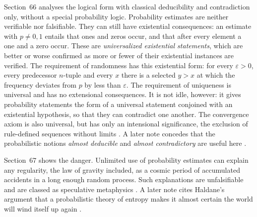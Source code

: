Section~66 analyses the logical form with classical deducibility and
contradiction only, without a special probability logic. Probability
estimates are neither verifiable nor falsifiable. They can still have
existential consequences: an estimate with \(p\neq0,1\) entails that
ones and zeros occur, and that after every element a one and a zero
occur. These are \emph{universalized existential statements}, which are
better or worse confirmed as more or fewer of their existential
instances are verified. The requirement of randomness has this
existential form: for every \(\varepsilon>0\), every predecessor
\(n\)-tuple and every \(x\) there is a selected \(y>x\) at which the
frequency deviates from \(p\) by less than \(\varepsilon\). The
requirement of uniqueness is universal and has no extensional
consequences. It is not idle, however: it gives probability statements
the form of a universal statement conjoined with an existential
hypothesis, so that they can contradict one another. The convergence
axiom is also universal, but has only an intensional significance, the
exclusion of rule-defined sequences without limits
\parencite[\S66 and notes~2--4]{Popper2002LogicDiscoveryUI}. A later
note concedes that the probabilistic notions \emph{almost deducible} and
\emph{almost contradictory} are useful here
\parencite[\S66, note~*1]{Popper2002LogicDiscoveryUI}.

Section~67 shows the danger. Unlimited use of probability estimates can
explain any regularity, the law of gravity included, as a cosmic period
of accumulated accidents in a long enough random process. Such
explanations are unfalsifiable and are classed as speculative
metaphysics \parencite[\S67]{Popper2002LogicDiscoveryUI}. A later note
cites Haldane's argument that a probabilistic theory of entropy makes it
almost certain the world will wind itself up again
\parencite[\S67, note~*1]{Popper2002LogicDiscoveryUI}.

